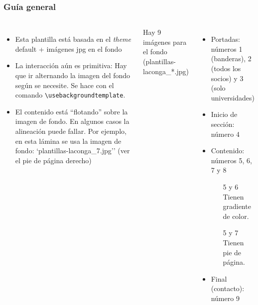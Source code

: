 \documentclass[aspectratio=169]{beamer}
\begin{document}
\begin{frame}[fragile]
\frametitle{Guía general}
\begin{columns}[c] %

\begin{itemize}
    \item Esta plantilla está basada en el {\it theme} default + imágenes jpg en el fondo
    \item La interacción aún es primitiva: Hay que ir alternando la imagen del fondo según se necesite. Se hace con el comando \verb:\usebackgroundtemplate:.
    \item El contenido está ``flotando'' sobre la imagen de fondo. En algunos casos la alineación puede fallar. Por ejemplo, en esta lámina se usa la imagen de fondo: `plantillas-laconga\_7.jpg'' (ver el pie de página derecho)
    
\end{itemize}

Hay 9 imágenes para el fondo (plantillas-laconga\_*.jpg)
\begin{itemize}
	\item Portadas: números 1 (banderas), 2 (todos los socios) y 3 (solo universidades)
	\item Inicio de sección: número 4
	\item Contenido: números 5, 6, 7 y 8
		\begin{itemize}
		\item[5 y 6] Tienen gradiente de color.
		\item[5 y 7] Tienen pie de página.
	\end{itemize}
	\item Final (contacto): número 9
\end{itemize}

\end{columns}
\end{frame}
\end{document}
